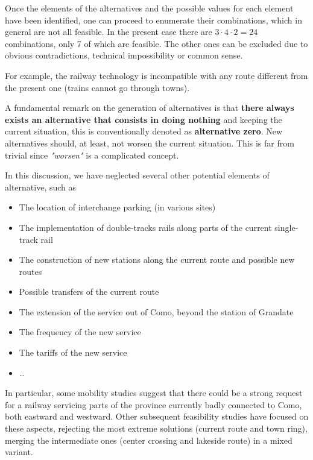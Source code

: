 Once the elements of the alternatives and the possible values for each element have been identified, one can proceed to enumerate their combinations, which in general are not all feasible. In the present case  there are $3 \cdot 4 \cdot 2 = 24$ combinations, only 7 of which are feasible. The other ones can be excluded due to obvious contradictions, technical impossibility or common sense. 

For example, the railway technology is incompatible with any route different from the present one (trains cannot go through towns).

A fundamental remark on the generation of alternatives is that \textbf{there always exists an alternative that consists in doing nothing} and keeping the current situation, this is conventionally denoted as \textbf{alternative zero}. New alternatives should, at least, not worsen the current situation. This is far from trivial since \textit{"worsen"} is a complicated concept.

In this discussion, we have neglected several other potential elements of alternative, such as
\begin{itemize}
	\item The location of interchange parking (in various sites)
	
	\item The implementation of double-tracks rails along parts of the current single-track rail
	
	\item The construction of new stations along the current route and possible new routes
	
	\item Possible transfers of the current route
	
	\item The extension of the service out of Como, beyond the station of Grandate
	
	\item The frequency of the new service
	
	\item The tariffs of the new service
	
	\item \dots
\end{itemize}

In particular, some mobility studies suggest that there could be a strong request for a railway servicing parts of the province currently badly connected to Como, both eastward and westward. Other subsequent feasibility studies have focused on these aspects, rejecting the most extreme solutions (current route and town ring), merging the intermediate ones (center crossing and lakeside route) in a mixed variant.

